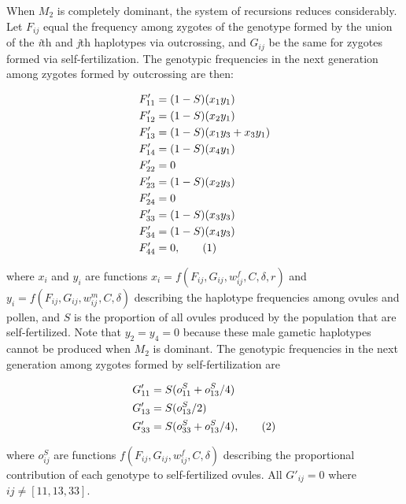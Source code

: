 \documentclass[9pt,twocolumn,twoside,lineno]{gsajnl}
\newcommand\numberthis{\addtocounter{equation}{1}\tag{\theequation}}
\begin{document}
When $M_2$ is completely dominant, the system of recursions reduces considerably. Let $F_{ij}$ equal the frequency among zygotes of the genotype formed by the union of the \textit{i}th and \textit{j}th haplotypes via outcrossing, and $G_{ij}$ be the same for zygotes formed via self-fertilization. The genotypic frequencies in the next generation among zygotes formed by outcrossing are then:
\begin{linenomath}\begin{align*} \label{eq:FprGyn}
    F'_{11} &= (1 - S) (x_1 y_1)  \\
    F'_{12} &= (1 - S) (x_2 y_1)  \\
    F'_{13} &= (1 - S) (x_1 y_3 + x_3 y_1)  \\
    F'_{14} &= (1 - S) (x_4 y_1)  \\
    F'_{22} &= 0 \\
    F'_{23} &= (1 - S) (x_2 y_3)  \\
    F'_{24} &= 0 \\
    F'_{33} &= (1 - S) (x_3 y_3)  \\
    F'_{34} &= (1 - S) (x_4 y_3)  \\
    F'_{44} &= 0, \numberthis
\end{align*}\end{linenomath}

\noindent where $x_{i}$ and $y_{i}$ are functions $x_i=f(F_{ij},G_{ij},w^f_{ij},C,\delta,r)$ and $y_i=f(F_{ij},G_{ij},w^m_{ij},C,\delta)$ describing the haplotype frequencies among ovules and pollen, and $S$ is the proportion of all ovules produced by the population that are self-fertilized. Note that $y_2=y_4=0$ because these male gametic haplotypes cannot be produced when $M_2$ is dominant. The genotypic frequencies in the next generation among zygotes formed by self-fertilization are 
\begin{linenomath}\begin{align*} \label{eq:GprGyn}
    G'_{11} &= S (o^S_{11} + o^S_{13}/4) \\
    G'_{13} &= S (o^S_{13}/2) \\
    G'_{33} &= S (o^S_{33} + o^S_{13}/4), \numberthis
\end{align*} \end{linenomath}

\noindent where $o^S_{ij}$ are functions $f(F_{ij},G_{ij},w^f_{ij},C,\delta)$ describing the proportional contribution of each genotype to self-fertilized ovules. All $G'_{ij} = 0$ where $ij \neq [11,13,33]$. 
\end{document}
